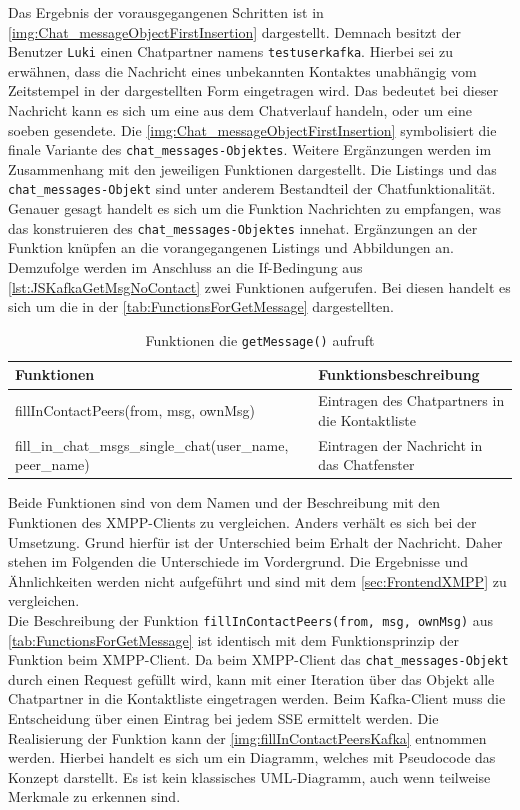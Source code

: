 \documentclass[a4paper,titlepage,halfparskip,12pt]{scrreprt}
\begin{document}
\begin{onehalfspacing}
Das Ergebnis der vorausgegangenen Schritten ist in \autoref{img:Chat_messageObjectFirstInsertion} dargestellt. Demnach besitzt der Benutzer \texttt{Luki} einen Chatpartner namens \texttt{testuserkafka}. Hierbei sei zu erwähnen, dass die Nachricht eines unbekannten Kontaktes unabhängig vom Zeitstempel in der dargestellten Form eingetragen wird. Das bedeutet bei dieser Nachricht kann es sich um eine aus dem Chatverlauf handeln, oder um eine soeben gesendete. 
Die \autoref{img:Chat_messageObjectFirstInsertion} symbolisiert die finale Variante des \texttt{chat\_messages-Objektes}. Weitere Ergänzungen werden im Zusammenhang mit den jeweiligen Funktionen dargestellt. Die Listings und das \texttt{chat\_messages-Objekt} sind unter anderem Bestandteil der Chatfunktionalität. Genauer gesagt handelt es sich um die Funktion Nachrichten zu empfangen, was das konstruieren des \texttt{chat\_messages-Objektes} innehat. Ergänzungen an der Funktion knüpfen an die vorangegangenen Listings und Abbildungen an. Demzufolge werden im Anschluss an die If-Bedingung aus \autoref{lst:JSKafkaGetMsgNoContact} zwei Funktionen aufgerufen. Bei diesen handelt es sich um die in der \autoref{tab:FunctionsForGetMessage} dargestellten.
\begin{table}[h]
	\centering
	\caption{Funktionen die \texttt{getMessage()} aufruft}
	\begin{tabular}{|p{6cm}|p{8.8cm}|}
		\hline
		\textbf{Funktionen} & \textbf{Funktionsbeschreibung} \\
		\hline
		fillInContactPeers(from, msg, ownMsg) & Eintragen des Chatpartners in die Kontaktliste\\
		\hline
		fill\_in\_chat\_msgs\_single\_chat\linebreak(user\_name, peer\_name) & Eintragen der Nachricht in das Chatfenster\\
		\hline
	\end{tabular}
	\label{tab:FunctionsForGetMessage}
\end{table}
Beide Funktionen sind von dem Namen und der Beschreibung mit den Funktionen des XMPP-Clients zu vergleichen. Anders verhält es sich bei der Umsetzung. Grund hierfür ist der Unterschied beim Erhalt der Nachricht. Daher stehen im Folgenden die Unterschiede im Vordergrund. Die Ergebnisse und Ähnlichkeiten werden nicht aufgeführt und sind mit dem \autoref{sec:FrontendXMPP} zu vergleichen.\\
Die Beschreibung der Funktion \texttt{fillInContactPeers(from, msg, ownMsg)} aus \autoref{tab:FunctionsForGetMessage} ist identisch mit dem Funktionsprinzip der Funktion beim XMPP-Client. Da beim XMPP-Client das \texttt{chat\_messages-Objekt} durch einen Request gefüllt wird, kann mit einer Iteration über das Objekt alle Chatpartner in die Kontaktliste eingetragen werden. Beim Kafka-Client muss die Entscheidung über einen Eintrag bei jedem SSE ermittelt werden. Die Realisierung der Funktion kann der \autoref{img:fillInContactPeersKafka} entnommen werden. Hierbei handelt es sich um ein Diagramm, welches mit Pseudocode das Konzept darstellt. Es ist kein klassisches UML-Diagramm, auch wenn teilweise Merkmale zu erkennen sind.

\end{onehalfspacing}
\end{document}
